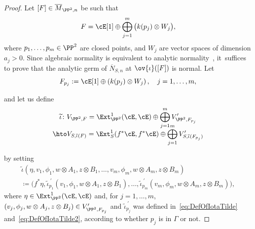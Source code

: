\begin{proof}
Let $[F]\in\overline{M}_{\PP^2,n}$ be such that\vspace*{-5pt}
\[
F=\cE[1]\oplus \bigoplus_{j=1}^m\, \bigl(k(p_j)\otimes W_j \bigr),
\]
where $p_1,\dots,p_m\in \PP^2$ are closed points, and $W_j$ are vector spaces of dimension $a_j>0$.
Since algebraic normality is equivalent to analytic normality~\cite[Satz 4]{Kuh}, it~suffices to prove that the analytic germ of $\overline{N}_{S,n}$ at $\ov{\iota}([F])$ is normal.
Let\vspace*{-3pt}
\[
F_{p_j}:=\cE[1]\oplus \left(k(p_j)\otimes W_j\right),\quad j=1,\dots,m,
\]
\noindent
\begin{minipage}{\textwidth}
and let us define\vspace*{-5pt}
\begin{multline}\label{eq:01122025}
\widetilde{\iota}\colon V_{\PP^2,F}= \Ext^1_{\PP^2}(\cE,\cE)\oplus \bigoplus_{j=1}^m V_{\PP^2,F_{p_j}}'\\[-10pt]
\hto V_{S,\overline{\iota}(F)}=\Ext^1_{S}(f^*\cE,f^*\cE)\oplus \bigoplus_{j=1}^m V_{S,\overline{\iota}(F_{p_j})}'
\end{multline}
\end{minipage}
\par\noindent
by setting\vspace*{-5pt}
\begin{multline*}
\widetilde{\iota}\left(\eta,v_1,\phi_1,w\otimes A_1,z\otimes B_1,\dots,v_m,\phi_m,w\otimes A_m,z\otimes B_m\right)\\
\coloneqq \bigl(f^*\eta,\widetilde{\iota}_{p_1}^{\ \prime}(v_1,\phi_1,w\otimes A_1,z\otimes B_1),\dots,\widetilde{\iota}_{p_m}^{\ \prime}(v_m,\phi_m,w\otimes A_m,z\otimes B_m)\bigr),
\end{multline*}
where $\eta\in\Ext^1_{\PP^2}(\cE,\cE)$ and, for $j=1,\dots,m$, $(v_j,\phi_j,w\otimes A_j,z\otimes B_j)\in V_{\PP^2,F_{p_j}}'$ and $\widetilde{\iota}_{p_j}^{\ \prime}$ was defined in~\eqref{eq:DefOfIotaTilde} and~\eqref{eq:DefOfIotaTilde2}, according to whether $p_j$ is in $\mathsf{\Gamma}$ or not.


\end{proof}
